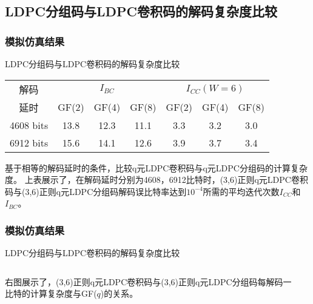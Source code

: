 \documentclass{beamer}
\begin{document}
\subsection{LDPC分组码与LDPC卷积码的解码复杂度比较}
\begin{frame}[shrink]
    \frametitle{模拟仿真结果}
        \begin{block}{LDPC分组码与LDPC卷积码的解码复杂度比较}
        \begin{center}
        \begin{tabular}{|c|c|c|c|c|c|c|}
 \hline
解码 & \multicolumn{3}{|c|}{$I_{BC}$} & \multicolumn{3}{|c|}{$I_{CC}(W=6)$} \\ \cline{2-7}
延时 & GF(2) & GF(4) & GF(8) & GF(2) & GF(4) & GF(8) \\ \hline
4608 bits & 13.8 & 12.3 & 11.1 & 3.3 & 3.2 & 3.0\\ \hline
6912 bits & 15.6 & 14.1 & 12.6 & 3.9 & 3.7 & 3.4\\ \hline
\end{tabular}
\end{center}
基于相等的解码延时的条件，比较q元LDPC卷积码与q元LDPC分组码的计算复杂度。
上表展示了，在解码延时分别为4608，6912比特时，(3,6)正则q元LDPC卷积码与(3,6)正则q元LDPC分组码解码误比特率达到$10^{-4}$所需的平均迭代次数$I_{CC}$和$I_{BC}$。
        \end{block}
\end{frame}
\begin{frame}[shrink]
    \frametitle{模拟仿真结果}
        \begin{block}{LDPC分组码与LDPC卷积码的解码复杂度比较}
        \begin{columns}
        \begin{column}{0.4\textwidth}
        右图展示了，(3,6)正则q元LDPC卷积码与(3,6)正则q元LDPC分组码每解码一比特的计算复杂度与GF($q$)的关系。
        \end{column}
        \begin{column}{0.6\textwidth}
        \begin{center}
\end{center}
        \end{column}
        \end{columns}
        \end{block}
\end{frame}
\end{document}
